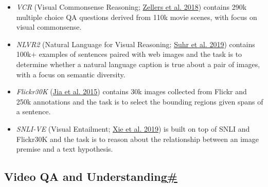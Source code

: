 \begin{itemize}
\tightlist
\item
  \emph{VCR} (Visual Commonsense Reasoning; \href{https://arxiv.org/abs/1811.10830}{Zellers et al. 2018}) contains 290k multiple choice QA questions derived from 110k movie scenes, with focus on visual commonsense.
\item
  \emph{NLVR2} (Natural Language for Visual Reasoning; \href{https://arxiv.org/abs/1811.00491}{Suhr et al. 2019}) contains 100k+ examples of sentences paired with web images and the task is to determine whether a natural language caption is true about a pair of images, with a focus on semantic diversity.
\item
  \emph{Flickr30K} (\href{https://arxiv.org/abs/1509.04942}{Jia et al. 2015}) contains 30k images collected from Flickr and 250k annotations and the task is to select the bounding regions given spans of a sentence.
\item
  \emph{SNLI-VE} (Visual Entailment; \href{https://arxiv.org/abs/1901.06706}{Xie et al. 2019}) is built on top of SNLI and Flickr30K and the task is to reason about the relationship between an image premise and a text hypothesis.
\end{itemize}

\subsection{\texorpdfstring{Video QA and Understanding\hyperref[video-qa-and-understanding]{\#}}{Video QA and Understanding\#}}\label{video-qa-and-understanding}

